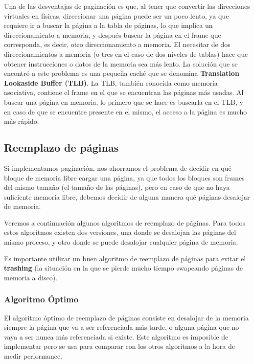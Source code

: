 \documentclass{article}
\begin{document}
Una de las desventajas de paginaci\'on es que, al tener que convertir las direcciones virtuales en f\'isicas, direccionar una p\'agina puede ser un poco lento, ya que requiere ir a buscar la p\'agina a la tabla de p\'aginas, lo que implica un direccionamiento a memoria, y despu\'es buscar la p\'agina en el frame que corresponda, es decir, otro direccionamiento a memoria. El necesitar de dos direccionamientos a memoria (o tres en el caso de dos niveles de tablas) hace que obtener instrucciones o datos de la memoria sea m\'as lento. La soluci\'on que se encontr\'o a este problema es una peque\~na cach\'e que se denomina \textbf{Translation Lookaside Buffer (TLB)}. La TLB, tambi\'en conocida como memoria asociativa, contiene el frame en el que se encuentran las p\'aginas m\'as usadas. Al buscar una p\'agina en memoria, lo primero que se hace es buscarla en el TLB, y en caso de que se encuentre presente en el mismo, el acceso a la p\'agina es mucho m\'as r\'apido.

\subsection{Reemplazo de p\'aginas}

Si implementamos paginaci\'on, nos ahorramos el problema de decidir en qu\'e bloque de memoria libre cargar una p\'agina, ya que todos los bloques son frames del mismo tama\~no (el tama\~no de las p\'aginas), pero en caso de que no haya suficiente memoria libre, debemos decidir de alguna manera qu\'e p\'aginas desalojar de memoria.

Veremos a continuaci\'on algunos algoritmos de reemplazo de p\'aginas. Para todos estos algoritmos existen dos versiones, una donde se desalojan las p\'aginas del mismo proceso, y otro donde se puede desalojar cualquier p\'agina de memoria.

Es importante utilizar un buen algoritmo de reemplazo de p\'aginas para evitar el \textbf{trashing} (la situaci\'on en la que se pierde mucho tiempo swapeando p\'aginas de memoria a disco).

\subsubsection{Algoritmo \'Optimo}

El algoritmo \'optimo de reemplazo de p\'aginas consiste en desalojar de la memoria siempre la p\'agina que va a ser referenciada m\'as tarde, o alguna p\'agina que no vaya a ser nunca m\'as referenciada si existe. Este algoritmo es imposible de implementar pero se usa para comparar con los otros algoritmos a la hora de medir performance.
\end{document}

